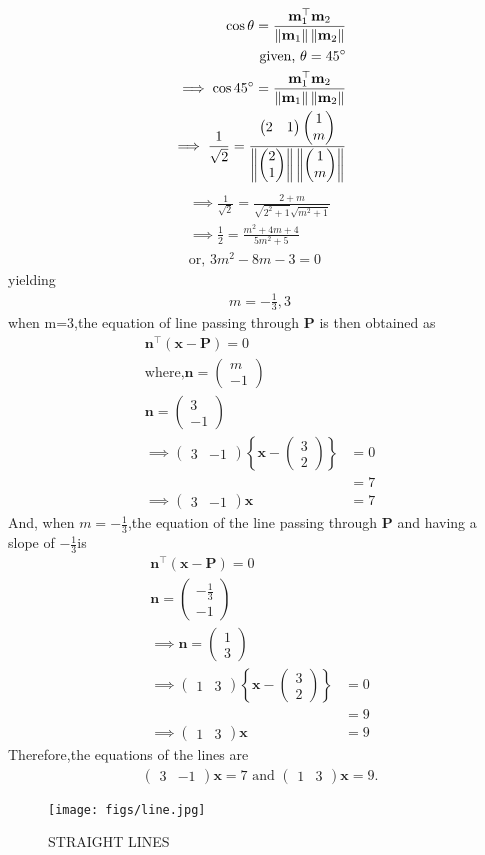 \documentclass[10pt,a4paper]{report}
\newcommand{\myvec}[1]{\ensuremath{\begin{pmatrix}#1\end{pmatrix}}}
\let\vec\mathbf
\providecommand{\cbrak}[1]{\ensuremath{\left\{#1\right\}}}
\providecommand{\norm}[1]{\left\lVert#1\right\rVert}
\let\vec\mathbf
\renewcommand{\vec}[1]{\textbf{#1}}
\begin{document}
\begin{align}
\cos \theta = \frac{\vec{m}_1^\top \vec{m}_2}{\norm{\vec{m}_1}\norm{\vec{m}_2}}\\
	\text{given, } \theta = 45\degree\\
\implies \cos45\degree =  \frac{\vec{m}_1^\top \vec{m}_2}{\norm{\vec{m}_1}\norm{\vec{m}_2}}\\
\implies \frac{1}{\sqrt{2}} = \frac{\myvec{2 & 1} \myvec{1\\m}}{\norm{\myvec{2\\1}}\norm{\myvec{1\\m}}}
\end{align}
\begin{align}
\implies \frac{1}{\sqrt{2}}=\frac{2+m}{\sqrt{2^2 + 1}\sqrt{m^2 + 1}}\\
\implies \frac{1}{2}=\frac{m^2 + 4m +4}{5m^2 +5}\\
\text{or, } 3m^2 - 8m -3 = 0
\end{align}
yielding
\begin{align}
m= - \frac{1}{3}, 3
\end{align} 
when m=3,the equation of line passing through $\vec{P}$  is then obtained as
\begin{align}
\vec{n}^{\top} ({\vec{x}-\vec{P}}) = 0\\
\text{where,}{\vec{n}}=\myvec{m\\-1} \\
{\vec{n}}=\myvec{3\\-1} \\
\implies 
	\myvec{3&-1}\cbrak{\vec{x}-\myvec{3\\2}}&=0\\
	&=7 \\
 \implies 	\myvec{3 & -1}\vec{x} &= 7
\end{align}
And, when $m=-\frac{1}{3}$,the equation of the line passing through $\vec{P}$  and having a slope of $-\frac{1}{3}$is
\begin{align}
\vec{n}^{\top} ({\vec{x}-\vec{P}}) = 0\\
{\vec{n}}=\myvec{-\frac{1}{3}\\-1} \\
\implies {\vec{n}}=\myvec{1\\3} \\
\implies 
	\myvec{1&3}\cbrak{\vec{x}-\myvec{3\\2}}&=0\\
	&=9 \\
		\implies 	\myvec{1 & 3}\vec{x} &= 9
\end{align}
Therefore,the equations of the lines are 
\begin{align}
	\myvec{3 & -1}\vec{x} = 7   \text{ and }  \myvec{1 & 3}\vec{x} = 9 .
\end{align}
\begin{figure}[H]
\centering
\texttt{[image: figs/line.jpg]}
\caption{STRAIGHT LINES}
\label{fig:line.jpg}
\end{figure}
\end{document}
